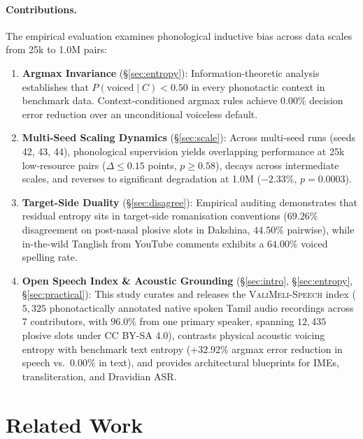 \documentclass[11pt]{article}
\begin{document}
\paragraph{Contributions.}
The empirical evaluation examines phonological inductive bias across data scales from 25k to 1.0M pairs:
\begin{enumerate}
    \item \textbf{Argmax Invariance} (\S\ref{sec:entropy}): Information-theoretic analysis establishes that $P(\text{voiced} \mid C) < 0.50$
    in every phonotactic context in benchmark data. Context-conditioned argmax rules achieve
    $0.00\%$ decision error reduction over an unconditional voiceless default.
    \item \textbf{Multi-Seed Scaling Dynamics} (\S\ref{sec:scale}): Across multi-seed runs
    (seeds 42, 43, 44), phonological supervision yields overlapping performance at 25k low-resource
    pairs ($\Delta \le 0.15$ points, $p \ge 0.58$), decays across intermediate scales, and reverses to
    significant degradation at 1.0M ($-2.33\%$, $p = 0.0003$).
    \item \textbf{Target-Side Duality} (\S\ref{sec:disagree}): Empirical auditing demonstrates that residual
    entropy sits in target-side romanisation conventions ($69.26\%$ disagreement on post-nasal
    plosive slots in Dakshina, $44.50\%$ pairwise), while in-the-wild Tanglish from YouTube comments exhibits a $64.00\%$ voiced spelling rate.
    \item \textbf{Open Speech Index \& Acoustic Grounding} (\S\ref{sec:intro}, \S\ref{sec:entropy}, \S\ref{sec:practical}): This study curates and releases the \textsc{ValiMeli-Speech} index ($5{,}325$ phonotactically annotated native spoken Tamil audio recordings across 7 contributors, with $96.0\%$ from one primary speaker, spanning $12{,}435$ plosive slots under CC BY-SA 4.0), contrasts physical acoustic voicing entropy with benchmark text entropy (+32.92\% argmax error reduction in speech vs.\ 0.00\% in text), and provides architectural blueprints for IMEs, transliteration, and Dravidian ASR.
\end{enumerate}

\section{Related Work}
\label{sec:related}
\end{document}
